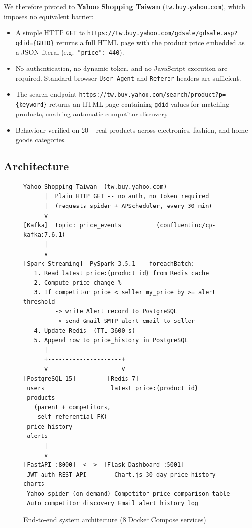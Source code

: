 \documentclass[11pt,a4paper]{article}
\begin{document}
We therefore pivoted to \textbf{Yahoo Shopping Taiwan}
(\texttt{tw.buy.yahoo.com}), which imposes no equivalent barrier:

\begin{itemize}
  \item A simple HTTP \texttt{GET} to
        \texttt{https://tw.buy.yahoo.com/gdsale/gdsale.asp?gdid=\{GDID\}}
        returns a full HTML page with the product price embedded as a JSON
        literal (e.g.\ \texttt{"price": 440}).
  \item No authentication, no dynamic token, and no JavaScript execution
        are required. Standard browser \texttt{User-Agent} and
        \texttt{Referer} headers are sufficient.
  \item The search endpoint
        \texttt{https://tw.buy.yahoo.com/search/product?p=\{keyword\}}
        returns an HTML page containing \texttt{gdid} values for matching
        products, enabling automatic competitor discovery.
  \item Behaviour verified on 20+ real products across electronics, fashion,
        and home goods categories.
\end{itemize}

\subsection{Architecture}

\begin{figure}[H]
\begin{lstlisting}[language={}]
Yahoo Shopping Taiwan  (tw.buy.yahoo.com)
      |  Plain HTTP GET -- no auth, no token required
      |  (requests spider + APScheduler, every 30 min)
      v
[Kafka]  topic: price_events          (confluentinc/cp-kafka:7.6.1)
      |
      v
[Spark Streaming]  PySpark 3.5.1 -- foreachBatch:
   1. Read latest_price:{product_id} from Redis cache
   2. Compute price-change %
   3. If competitor price < seller my_price by >= alert threshold
         -> write Alert record to PostgreSQL
         -> send Gmail SMTP alert email to seller
   4. Update Redis  (TTL 3600 s)
   5. Append row to price_history in PostgreSQL
      |
      +---------------------+
      v                     v
[PostgreSQL 15]         [Redis 7]
 users                   latest_price:{product_id}
 products
   (parent + competitors,
    self-referential FK)
 price_history
 alerts
      |
      v
[FastAPI :8000]  <-->  [Flask Dashboard :5001]
 JWT auth REST API        Chart.js 30-day price-history charts
 Yahoo spider (on-demand) Competitor price comparison table
 Auto competitor discovery Email alert history log
\end{lstlisting}
\caption{End-to-end system architecture (8 Docker Compose services)}
\end{figure}
\end{document}
